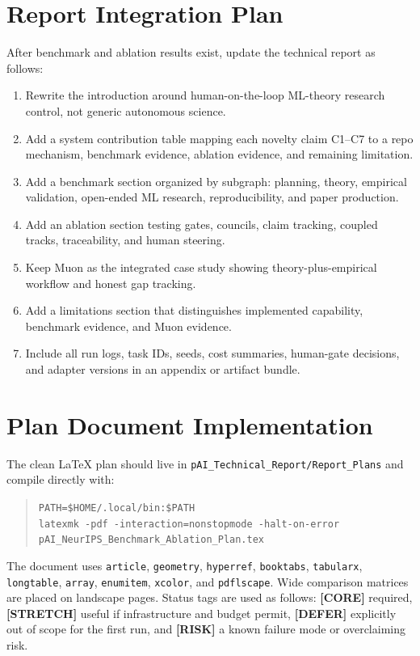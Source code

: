 \documentclass[11pt]{article}
\newcommand{\core}{\textbf{\textcolor{green!45!black}{[CORE]}}}
\newcommand{\tagstretch}{\textbf{\textcolor{blue!65!black}{[STRETCH]}}}
\newcommand{\defer}{\textbf{\textcolor{orange!80!black}{[DEFER]}}}
\newcommand{\risk}{\textbf{\textcolor{red!65!black}{[RISK]}}}
\begin{document}
\section*{Report Integration Plan}

After benchmark and ablation results exist, update the technical report as follows:

\begin{enumerate}
  \item Rewrite the introduction around human-on-the-loop ML-theory research control, not generic autonomous science.
  \item Add a system contribution table mapping each novelty claim C1--C7 to a repo mechanism, benchmark evidence, ablation evidence, and remaining limitation.
  \item Add a benchmark section organized by subgraph: planning, theory, empirical validation, open-ended ML research, reproducibility, and paper production.
  \item Add an ablation section testing gates, councils, claim tracking, coupled tracks, traceability, and human steering.
  \item Keep Muon as the integrated case study showing theory-plus-empirical workflow and honest gap tracking.
  \item Add a limitations section that distinguishes implemented capability, benchmark evidence, and Muon evidence.
  \item Include all run logs, task IDs, seeds, cost summaries, human-gate decisions, and adapter versions in an appendix or artifact bundle.
\end{enumerate}

\section*{Plan Document Implementation}

The clean LaTeX plan should live in \texttt{pAI\_Technical\_Report/Report\_Plans} and compile directly with:

\begin{quote}
\small
\texttt{PATH=\$HOME/.local/bin:\$PATH}\\
\texttt{latexmk -pdf -interaction=nonstopmode -halt-on-error}\\
\texttt{pAI\_NeurIPS\_Benchmark\_Ablation\_Plan.tex}
\end{quote}

The document uses \texttt{article}, \texttt{geometry}, \texttt{hyperref}, \texttt{booktabs}, \texttt{tabularx}, \texttt{longtable}, \texttt{array}, \texttt{enumitem}, \texttt{xcolor}, and \texttt{pdflscape}. Wide comparison matrices are placed on landscape pages. Status tags are used as follows: \core{} required, \tagstretch{} useful if infrastructure and budget permit, \defer{} explicitly out of scope for the first run, and \risk{} a known failure mode or overclaiming risk.
\end{document}
